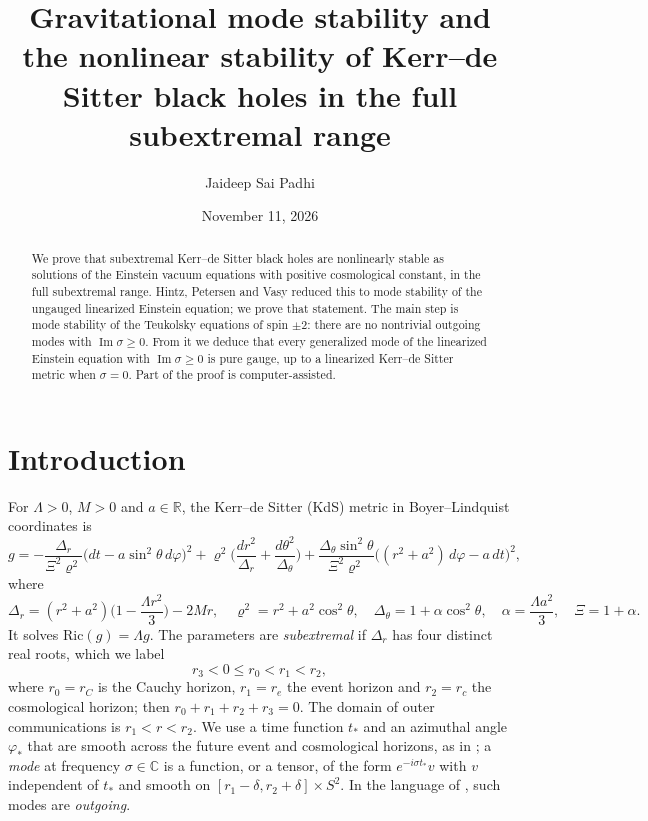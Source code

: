 \documentclass[11pt]{amsart}
\title[Stability of Kerr--de Sitter black holes]{Gravitational mode stability and the nonlinear stability of Kerr--de Sitter black holes in the full subextremal range}
\author{Jaideep Sai Padhi}
\date{November 11, 2026}
\theoremstyle{definition}
\theoremstyle{remark}
\numberwithin{equation}{section}
\newcommand{\R}{\mathbb{R}}
\newcommand{\C}{\mathbb{C}}
\renewcommand{\Im}{\operatorname{Im}}
\begin{document}
\begin{abstract}
We prove that subextremal Kerr--de Sitter black holes are nonlinearly stable as solutions of the Einstein vacuum
equations with positive cosmological constant, in the full subextremal range. Hintz, Petersen and Vasy reduced this to
mode stability of the ungauged linearized Einstein equation; we prove that statement. The main step is mode stability
of the Teukolsky equations of spin $\pm2$: there are no nontrivial outgoing modes with $\Im\sigma\ge0$. From it we deduce
that every generalized mode of the linearized Einstein equation with $\Im\sigma\ge0$ is pure gauge, up to a linearized
Kerr--de Sitter metric when $\sigma=0$. Part of the proof is computer-assisted.
\end{abstract}

\maketitle

\section{Introduction}\label{sec:intro}

For $\Lambda>0$, $M>0$ and $a\in\R$, the Kerr--de Sitter (KdS) metric in Boyer--Lindquist coordinates is
\begin{equation}\label{eq:kds}
g=-\frac{\Delta_r}{\Xi^2\varrho^2}\big(dt-a\sin^2\theta\,d\varphi\big)^2+\varrho^2\Big(\frac{dr^2}{\Delta_r}+\frac{d\theta^2}{\Delta_\theta}\Big)
+\frac{\Delta_\theta\sin^2\theta}{\Xi^2\varrho^2}\big((r^2+a^2)\,d\varphi-a\,dt\big)^2,
\end{equation}
where
\[
\Delta_r=(r^2+a^2)\Big(1-\frac{\Lambda r^2}{3}\Big)-2Mr,\quad \varrho^2=r^2+a^2\cos^2\theta,\quad
\Delta_\theta=1+\alpha\cos^2\theta,\quad \alpha=\frac{\Lambda a^2}{3},\quad \Xi=1+\alpha.
\]
It solves $\mathrm{Ric}(g)=\Lambda g$. The parameters are \emph{subextremal} if $\Delta_r$ has four distinct real
roots, which we label
\[
r_3<0\le r_0<r_1<r_2,
\]
where $r_0=r_C$ is the Cauchy horizon, $r_1=r_e$ the event horizon and $r_2=r_c$ the cosmological horizon;
then $r_0+r_1+r_2+r_3=0$. The domain of outer communications is $r_1<r<r_2$. We use a time function $t_*$ and an
azimuthal angle $\varphi_*$ that are smooth across the future event and cosmological horizons, as in
\cite{HPV25,Hin26}; a \emph{mode} at frequency $\sigma\in\C$ is a function, or a tensor, of the form
$e^{-i\sigma t_*}v$ with $v$ independent of $t_*$ and smooth on $[r_1-\delta,r_2+\delta]\times S^2$. In the language of
\cite{Hin26}, such modes are \emph{outgoing}.
\end{document}

